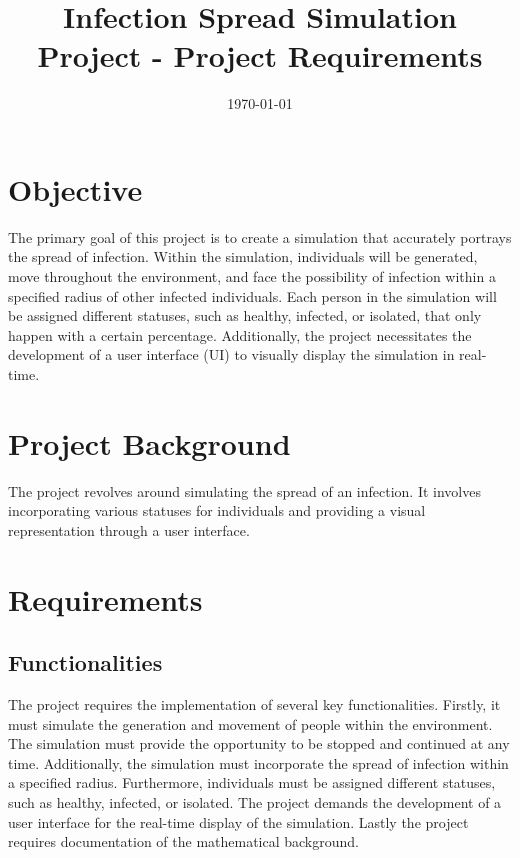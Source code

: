 \documentclass{article}
\begin{document}
	\title{Infection Spread Simulation Project - Project Requirements}
	\author{}
	\date{\today}
	\maketitle
	\newpage
	\tableofcontents
	\newpage
	
	\section{Objective}
	The primary goal of this project is to create a simulation that accurately portrays the spread of infection. Within the simulation, individuals will be generated, move throughout the environment, and face the possibility of infection within a specified radius of other infected individuals. Each person in the simulation will be assigned different statuses, such as healthy, infected, or isolated, that only happen with a certain percentage. Additionally, the project necessitates the development of a user interface (UI) to visually display the simulation in real-time.
	
	\section{Project Background}
	The project revolves around simulating the spread of an infection. It involves incorporating various statuses for individuals and providing a visual representation through a user interface.
	
	\section{Requirements}
	
	\subsection{Functionalities}
	The project requires the implementation of several key functionalities. Firstly, it must simulate the generation and movement of people within the environment. The simulation must provide the opportunity to be stopped and continued at any time. Additionally, the simulation must incorporate the spread of infection within a specified radius. Furthermore, individuals must be assigned different statuses, such as healthy, infected, or isolated. The project demands the development of a user interface for the real-time display of the simulation. Lastly the project requires documentation of the mathematical background.
	
\end{document}
